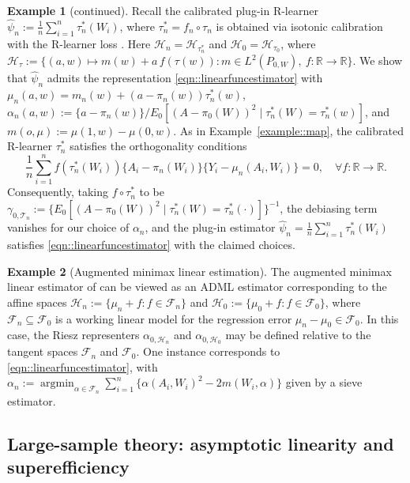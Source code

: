\documentclass[11pt]{article}
\DeclareMathOperator*{\argmin}{argmin}
\theoremstyle{definition}
\newtheorem{example}{Example}
\begin{document}
 
\begin{example}[continued]
Recall the calibrated plug-in R-learner \(\widehat{\psi}_n := \frac{1}{n}\sum_{i=1}^n \tau_n^*(W_i)\), where \(\tau_n^* = f_n \circ \tau_n\) is obtained via isotonic calibration with the R-learner loss \citep{van2023causal, nie2021quasi}. Here \(\mathcal{H}_n = \mathcal{H}_{\tau_n^*}\) and \(\mathcal{H}_0 = \mathcal{H}_{\tau_0}\), where \(\mathcal{H}_\tau := \{(a,w) \mapsto m(w) + a\, f(\tau(w)) : m \in L^2(P_{0,W}),\ f:\mathbb{R} \to \mathbb{R}\}\). We show that \(\widehat{\psi}_n\) admits the representation \eqref{eqn::linearfuncestimator} with \(\mu_n(a,w) = m_n(w) + (a - \pi_n(w))\tau_n^*(w)\), \(\alpha_n(a,w) := \{a - \pi_n(w)\}/E_0[(A - \pi_0(W))^2 \mid \tau_n^*(W) = \tau_n^*(w)]\), and \(m(o,\mu) := \mu(1,w) - \mu(0,w)\). As in Example~\ref{example::map}, the calibrated R-learner \(\tau_n^*\) satisfies the orthogonality conditions
\[
\frac{1}{n} \sum_{i=1}^n f(\tau_n^*(W_i))\{A_i - \pi_n(W_i)\}\{Y_i - \mu_n(A_i,W_i)\} = 0, \quad \forall f:\mathbb{R} \to \mathbb{R}.
\]
Consequently, taking \(f \circ \tau_n^*\) to be \(\gamma_{0,\mathcal{T}_n} := \{E_0[(A - \pi_0(W))^2 \mid \tau_n^*(W) = \tau_n^*(\cdot)]\}^{-1}\), the debiasing term vanishes for our choice of \(\alpha_n\), and the plug-in estimator \(\widehat{\psi}_n = \frac{1}{n}\sum_{i=1}^n \tau_n^*(W_i)\) satisfies \eqref{eqn::linearfuncestimator} with the claimed choices.
\end{example}

\begin{example}[Augmented minimax linear estimation]
The augmented minimax linear estimator of \cite{augmentedMinimax} can be viewed as an ADML estimator corresponding to the affine spaces $\mathcal{H}_n := \{\mu_n + f: f \in \mathcal{F}_n\}$ and $\mathcal{H}_0 := \{\mu_0 + f: f \in \mathcal{F}_0\}$, where $\mathcal{F}_n \subseteq \mathcal{F}_0$ is a working linear model for the regression error $\mu_n - \mu_0 \in \mathcal{F}_0$. In this case, the Riesz representers $\alpha_{0,\mathcal{H}_n}$ and $\alpha_{0,\mathcal{H}_0}$ may be defined relative to the tangent spaces $\mathcal{F}_n$ and $\mathcal{F}_0$. One instance corresponds to \eqref{eqn::linearfuncestimator}, with $\alpha_n := \argmin_{\alpha \in \mathcal{F}_n} \sum_{i=1}^n \{\alpha(A_i, W_i)^2 - 2 m(W_i, \alpha)\}$ given by a sieve estimator.
\end{example}



\subsection{Large-sample theory: asymptotic linearity and superefficiency}
\end{document}
